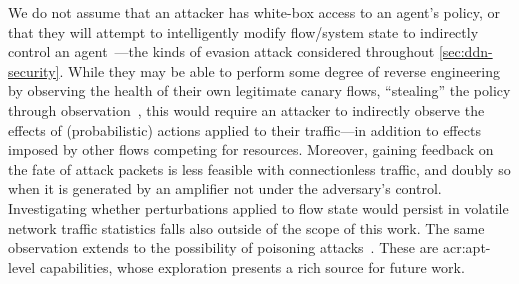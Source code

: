 We do not assume that an attacker has white-box access to an agent's policy, or that they will attempt to intelligently modify flow/system state to indirectly control an agent~\parencite{DBLP:conf/eurosp/PapernotMJFCS16, DBLP:conf/eurosp/PapernotMSW18, DBLP:journals/corr/HuangPGDA17, DBLP:conf/sp/Carlini017}---the kinds of evasion attack considered throughout \cref{sec:ddn-security}.
While they may be able to perform some degree of reverse engineering by observing the health of their own legitimate canary flows, ``stealing'' the policy through observation~\parencite{DBLP:conf/uss/TramerZJRR16}, this would require an attacker to indirectly observe the effects of (probabilistic) actions applied to their traffic---in addition to effects imposed by other flows competing for resources.
Moreover, gaining feedback on the fate of attack packets is less feasible with connectionless traffic, and doubly so when it is generated by an amplifier not under the adversary's control.
Investigating whether perturbations applied to flow state would persist in volatile network traffic statistics falls also outside of the scope of this work.
The same observation extends to the possibility of poisoning attacks~\parencite{DBLP:journals/corr/abs-1902-09062}.
These are \gls{acr:apt}-level capabilities, whose exploration presents a rich source for future work.